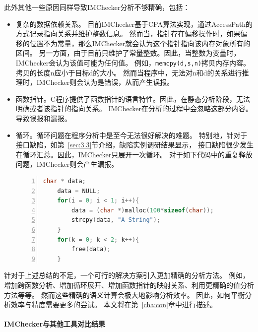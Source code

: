 此外其他一些原因同样导致IMChecker分析不够精确，包括：
\begin{itemize}
	\item 复杂的数据依赖关系。
	目前IMChecker基于CPA算法实现，通过AccessPath的方式记录指向关系并维护整数信息。
	然而当，指针存在偏移操作时，如果偏移的位置不为常量，那么IMChecker就会认为这个指针指向该内存对象所有的区间。
	另一方面，由于目前只维护了常量整数。因此，当整数为变量时，IMChecker会认为该值可能为任何值。
	例如，\texttt{memcpy(d,s,n)}拷贝内存内容。拷贝的长度n应小于目标d的大小。
	然而当程序中，无法对n和d的关系进行推理时，IMChecker则会认为是错误，从而产生误报。
	\item 函数指针。C程序提供了函数指针的语言特性。因此，在静态分析阶段，无法明确或者该指针的指向关系。
	IMChecker在分析的过程中会忽略这部分内容。导致误报和漏报。
	\item 循环。循环问题在程序分析中是至今无法很好解决的难题。
	特别地，针对于接口缺陷，如第~\ref{sec:3.3}节介绍，缺陷实例调研结果显示，
	接口缺陷很少发生在循环汇总。因此，IMChecker只展开一次循环。
	对于如下代码中的重复释放问题，IMChecker则会产生漏报。
\begin{lstlisting}[language={C},
basicstyle=\linespread{0.7}\listingsfont,
numbers=left,
xleftmargin=.2\textwidth]
	char * data;
	data = NULL;
	for(i = 0; i < 1; i++){
		data = (char *)malloc(100*sizeof(char));
		strcpy(data, "A String");
	}
	for(k = 0; k < 2; k++){
		free(data);
	}
\end{lstlisting}	
\end{itemize}

针对于上述总结的不足，一个可行的解决方案引入更加精确的分析方法。
例如，增加跨函数分析、增加循环展开、增加函数指针的映射关系、利用更精确的值分析方法等等。
然而这些精确的语义计算会极大地影响分析效率。
因此，如何平衡分析效率与精度需要更多的尝试。
本文将在第~\ref{cha:con}章中进行描述。

\paragraph{IMChecker与其他工具对比结果}



